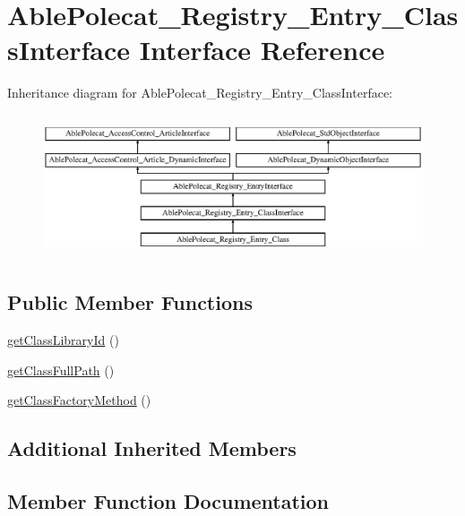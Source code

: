 \hypertarget{interface_able_polecat___registry___entry___class_interface}{}\section{Able\+Polecat\+\_\+\+Registry\+\_\+\+Entry\+\_\+\+Class\+Interface Interface Reference}
\label{interface_able_polecat___registry___entry___class_interface}
Inheritance diagram for Able\+Polecat\+\_\+\+Registry\+\_\+\+Entry\+\_\+\+Class\+Interface\+:\begin{figure}[H]
\begin{center}
\leavevmode
\includegraphics[height=4.268293cm]{interface_able_polecat___registry___entry___class_interface}
\end{center}
\end{figure}
\subsection*{Public Member Functions}
\begin{DoxyCompactItemize}
\item 
\hyperlink{interface_able_polecat___registry___entry___class_interface_a51ab292213d530e6ec65ef6c1a59b244}{get\+Class\+Library\+Id} ()
\item 
\hyperlink{interface_able_polecat___registry___entry___class_interface_a007ade3aa1414f464fe5670e2ee3b3e5}{get\+Class\+Full\+Path} ()
\item 
\hyperlink{interface_able_polecat___registry___entry___class_interface_a1234be8925a14bd9f504ebd18a16b4ed}{get\+Class\+Factory\+Method} ()
\end{DoxyCompactItemize}
\subsection*{Additional Inherited Members}


\subsection{Member Function Documentation}
\hypertarget{interface_able_polecat___registry___entry___class_interface_a1234be8925a14bd9f504ebd18a16b4ed}{}
